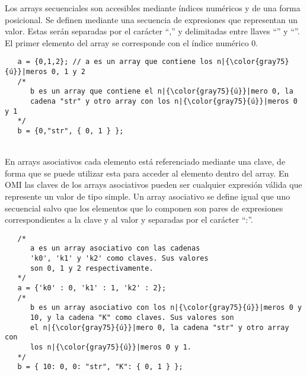 Los arrays secuenciales son accesibles mediante índices numéricos y de una forma posicional. Se definen mediante una secuencia de expresiones que representan 
un valor. Estas serán separadas por el carácter ``,'' y delimitadas entre llaves ``{'' y ``}''. El primer elemento del array se corresponde con el índice numérico $0$. \\

 \begin{lstlisting}
   a = {0,1,2}; // a es un array que contiene los n|{\color{gray75}{ú}}|meros 0, 1 y 2
   /* 
      b es un array que contiene el n|{\color{gray75}{ú}}|mero 0, la
      cadena "str" y otro array con los n|{\color{gray75}{ú}}|meros 0 y 1
   */
   b = {0,"str", { 0, 1 } }; 
\end{lstlisting}
\hfill\\

En arrays asociativos cada elemento está referenciado mediante una clave, de forma que se puede utilizar esta para acceder al elemento dentro del array. En OMI las claves 
de los arrays asociativos pueden ser cualquier expresión válida que represente un valor de tipo simple. Un array asociativo se define igual que uno secuencial salvo que los elementos que lo
componen son pares de expresiones correspondientes a la clave y al valor y separadas por el carácter ``:''. \\

\begin{lstlisting}
   /*
      a es un array asociativo con las cadenas
      'k0', 'k1' y 'k2' como claves. Sus valores 
      son 0, 1 y 2 respectivamente.
   */
   a = {'k0' : 0, 'k1' : 1, 'k2' : 2};
   /* 
      b es un array asociativo con los n|{\color{gray75}{ú}}|meros 0 y
      10, y la cadena "K" como claves. Sus valores son
      el n|{\color{gray75}{ú}}|mero 0, la cadena "str" y otro array con 
      los n|{\color{gray75}{ú}}|meros 0 y 1.
   */
   b = { 10: 0, 0: "str", "K": { 0, 1 } }; 
\end{lstlisting}
\hfill\\


